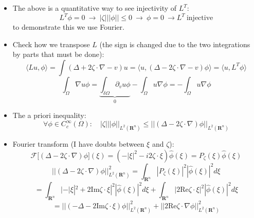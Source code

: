\documentclass{article}
\begin{document}
\begin{itemize}
    \item The above is a quantitative way to see injectivity of $L^T$:
    \begin{equation}
        L^T \phi = 0 \ \rightarrow \ |\zeta|||\phi|| \leq 0 \ \rightarrow \ \phi = 0 \ \rightarrow L^T \ \text{injective}
    \end{equation}
    to demonstrate this we use Fourier.

    \item Check how we transpose $L$ (the sign is changed due to the two integrations by parts that must be done):
    \begin{equation}
        \langle Lu,\phi \rangle = \int (\Delta + 2\zeta\cdot \nabla - v) u = \langle u, (\Delta - 2\zeta\cdot \nabla - v)\phi \rangle = \langle u, L^T \phi\rangle
    \end{equation}
    \begin{equation}
        \int_\Omega \nabla u \phi = \underbrace{\int_{\delta \Omega} \partial_v u\phi}_{0} - \int_{ \Omega}  u \nabla \phi = - \int_{ \Omega}  u \nabla \phi 
    \end{equation}

    \item The a priori inequality:
    \begin{equation}
        \forall \phi \in C_c^\infty(\Omega): \quad  |\zeta|||\phi||_{L^2(\mathbf{R}^n)} \leq ||(\Delta - 2\zeta \cdot \nabla)\phi||_{L^2(\mathbf{R}^n)}
    \end{equation}

    \item Fourier transform (I have doubts between $\xi$ and $\zeta$):
    \begin{equation}
         \mathcal{F} \big[(\Delta - 2\zeta \cdot \nabla)\phi  \big](\xi) = (-|\xi|^2 - i2\zeta \cdot \xi) \hat{\phi}(\xi) = P_\zeta (\xi) \hat{\phi}(\xi)
    \end{equation}
    \begin{equation}
        ||(\Delta - 2\zeta \cdot \nabla)\phi||^2_{L^2(\mathbf{R}^n)} = \int_{\mathbf{R}^n} |P_\zeta (\xi)|^2 |\hat{\phi}(\xi)|^2 d\xi 
    \end{equation}
    \begin{equation}
        = \int_{\mathbf{R}^n} |- |\xi|^2 + 2\text{Im}\zeta \cdot \xi |^2 |\hat{\phi}(\xi)|^2 d\xi + \int_{\mathbf{R}^n} |2\text{Re}\zeta \cdot \xi|^2 |\hat{\phi}(\xi)|^2 d\xi
    \end{equation}
    \begin{equation}
        = ||(-\Delta - 2 \text{Im}\zeta \cdot \xi)\phi||^2_{L^2(\mathbf{R}^n)} + || 2 \text{Re}\zeta \cdot \nabla\phi||^2_{L^2(\mathbf{R}^n)}
    \end{equation}


\end{itemize}
\end{document}
